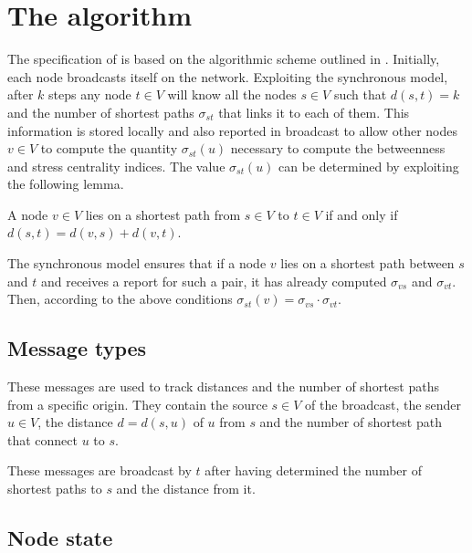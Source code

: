
\section{The \deccen{} algorithm}
\label{sec:deccen}

The specification of \deccen{} is based on the algorithmic scheme outlined in \citet{lehmann2003}. Initially, each node broadcasts itself on the network. Exploiting the synchronous model, after $k$ steps any node $t \in V$ will know all the nodes $s \in V$ such that $d(s,t) = k$ and the number of shortest paths  $\sigma_{st}$ that links it to each of them. This information is stored locally and also reported in broadcast to allow other nodes $v \in V$ to compute the quantity $\sigma_{st}(u)$ necessary to compute the betweenness and stress centrality indices. The value $\sigma_{st}(u)$ can be determined by exploiting the following lemma.

\begin{lemma}
A node $v \in V$ lies on a shortest path from $s \in V$ to $t \in V$ if and only if $d(s,t) = d(v,s) + d(v,t)$.
\end{lemma}

The synchronous model ensures that if a node $v$ lies on a shortest path between $s$ and $t$ and receives a report for such a pair, it has already computed $\sigma_{vs}$ and $\sigma_{vt}$. Then, according to the above conditions $\sigma_{st}(v) = \sigma_{vs} \cdot \sigma_{vt}$.

\subsection{Message types}
\begin{description}[leftmargin=0cm]
\item[\mdiscargs{s}{u}{d}] These messages are used to track distances and the number of shortest paths from a specific origin. They contain the source $s \in V$ of the broadcast, the sender $u \in V$, the distance $d = d(s,u)$ of $u$ from $s$ and the number of shortest path that connect $u$ to $s$.

\item[\mdecrepargs{s}{t}] These messages are broadcast by $t$ after having determined the number of shortest paths to $s$ and the distance from it.
\end{description}

\subsection{Node state}

